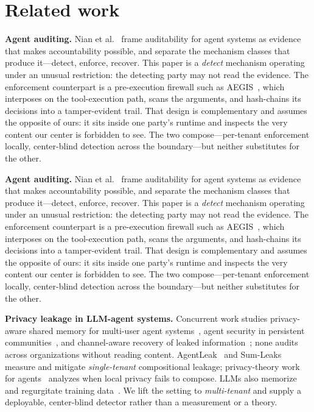 \documentclass{article}
\begin{document}
\section{Related work}

\noindent\textbf{Agent auditing.} Nian et al.~\citep{auditableagents} frame
auditability for agent systems as evidence that makes accountability possible, and
separate the mechanism classes that produce it---detect, enforce, recover. This
paper is a \emph{detect} mechanism operating under an unusual restriction: the
detecting party may not read the evidence. The enforcement counterpart is a
pre-execution firewall such as AEGIS~\citep{aegis}, which interposes on the
tool-execution path, scans the arguments, and hash-chains its decisions into a
tamper-evident trail. That design is complementary and assumes the opposite of
ours: it sits inside one party's runtime and inspects the very content our center
is forbidden to see. The two compose---per-tenant enforcement locally, center-blind
detection across the boundary---but neither substitutes for the other.

\noindent\textbf{Agent auditing.} Nian et al.~\citep{auditableagents} frame
auditability for agent systems as evidence that makes accountability possible, and
separate the mechanism classes that produce it---detect, enforce, recover. This
paper is a \emph{detect} mechanism operating under an unusual restriction: the
detecting party may not read the evidence. The enforcement counterpart is a
pre-execution firewall such as AEGIS~\citep{aegis}, which interposes on the
tool-execution path, scans the arguments, and hash-chains its decisions into a
tamper-evident trail. That design is complementary and assumes the opposite of
ours: it sits inside one party's runtime and inspects the very content our center
is forbidden to see. The two compose---per-tenant enforcement locally, center-blind
detection across the boundary---but neither substitutes for the other.

\noindent\textbf{Privacy leakage in LLM-agent systems.} Concurrent work studies privacy-aware shared memory for multi-user agent systems~\citep{aim2026}, agent security in persistent communities~\citep{cosec2026}, and channel-aware recovery of leaked information~\citep{cipl2026}; none audits across organizations without reading content. AgentLeak~\citep{agentleak}
and Sum-Leaks~\citep{sumleaks} measure and mitigate \emph{single-tenant}
compositional leakage; privacy-theory work for agents~\citep{dpagents,itlimits}
analyzes when local privacy fails to compose. LLMs also memorize and regurgitate
training data~\citep{carlini21,carlini23}. We lift the setting to \emph{multi-tenant}
and supply a deployable, center-blind detector rather than a measurement or a
theory.
\end{document}
